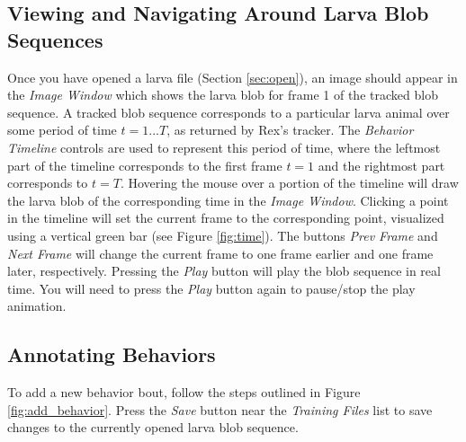 \documentclass[10pt, onecolumn]{article}
\newcommand{\1}{\textbf{1}}
\begin{document}
\subsection{Viewing and Navigating Around Larva Blob Sequences}
Once you have opened a larva file (Section \ref{sec:open}), an image should appear in the \textit{Image Window} which shows the larva blob for frame 1 of the tracked blob sequence.  A tracked blob sequence corresponds to a particular larva animal over some period of time $t=1...T$, as returned by Rex's tracker.  The \textit{Behavior Timeline} controls are used to represent this period of time, where the leftmost part of the timeline corresponds to the first frame $t=1$ and the rightmost part corresponds to $t=T$.  Hovering the mouse over a portion of the timeline will draw the larva blob of the corresponding time in the \textit{Image Window}.  Clicking a point in the timeline will set the current frame to the corresponding point, visualized using a vertical green bar (see Figure \ref{fig:time}).  The buttons \textit{Prev Frame} and \textit{Next Frame} will change the current frame to one frame earlier and one frame later, respectively.  Pressing the \textit{Play} button will play the blob sequence in real time.  You will need to press the \textit{Play} button again to pause/stop the play animation.

\subsection{Annotating Behaviors}

To add a new behavior bout, follow the steps outlined in Figure \ref{fig:add_behavior}.  Press the \textit{Save} button near the \textit{Training Files} list to save changes to the currently opened larva blob sequence.
\end{document}
